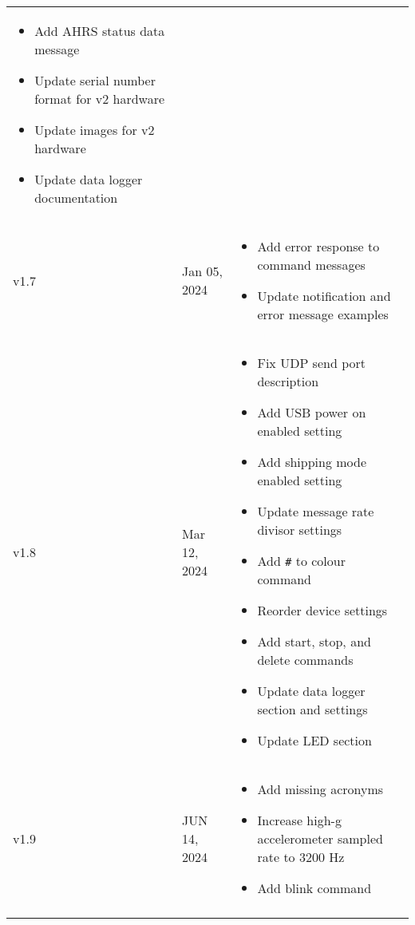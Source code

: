 \begin{longtable}{| >{\centering}p{} | p{} | >{\raggedright\arraybackslash}p{} |}
\begin{itemize}
        \item Add \acs{AHRS} status data message
        \item Update serial number format for v2 hardware
        \item Update images for v2 hardware
        \item Update data logger documentation
    \end{itemize}\\
    v1.7 & Jan 05, 2024 &
    \begin{itemize}
        \item Add error response to command messages
        \item Update notification and error message examples
    \end{itemize}\\
    v1.8 & Mar 12, 2024 &
    \begin{itemize}
        \item Fix \acs{UDP} send port description
        \item Add \ac{USB} power on enabled setting
        \item Add shipping mode enabled setting
        \item Update message rate divisor settings
        \item Add \texttt{\#} to colour command
        \item Reorder device settings
        \item Add start, stop, and delete commands
        \item Update data logger section and settings
        \item Update \ac{LED} section
    \end{itemize}\\
    v1.9 & JUN 14, 2024 &
    \begin{itemize}
        \item Add missing acronyms
        \item Increase high-g accelerometer sampled rate to 3200 Hz
        \item Add blink command
    \end{itemize}\\
    \arrayrulecolor{gray!50}\hline
\end{longtable}
